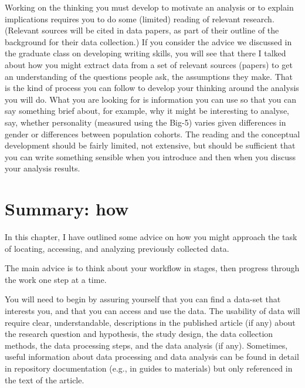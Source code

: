 \documentclass[
  letterpaper,
  DIV=11,
  numbers=noendperiod]{scrreprt}
\begin{document}
Working on the thinking you must develop to motivate an analysis or to
explain implications requires you to do some (limited) reading of
relevant research. (Relevant sources will be cited in data papers, as
part of their outline of the background for their data collection.) If
you consider the advice we discussed in the graduate class on developing
writing skills, you will see that there I talked about how you might
extract data from a set of relevant sources (papers) to get an
understanding of the questions people ask, the assumptions they make.
That is the kind of process you can follow to develop your thinking
around the analysis you will do. What you are looking for is information
you can use so that you can say something brief about, for example, why
it might be interesting to analyse, say, whether personality (measured
using the Big-5) varies given differences in gender or differences
between population cohorts. The reading and the conceptual development
should be fairly limited, not extensive, but should be sufficient that
you can write something sensible when you introduce and then when you
discuss your analysis results.

\hypertarget{sec-how-summary}{%
\section{Summary: how}\label{sec-how-summary}}

In this chapter, I have outlined some advice on how you might approach
the task of locating, accessing, and analyzing previously collected
data.

\begin{tcolorbox}[enhanced jigsaw, opacitybacktitle=0.6, title=\textcolor{quarto-callout-tip-color}{\faLightbulb}\hspace{0.5em}{Tip}, arc=.35mm, colbacktitle=quarto-callout-tip-color!10!white, colframe=quarto-callout-tip-color-frame, leftrule=.75mm, opacityback=0, breakable, titlerule=0mm, left=2mm, bottomrule=.15mm, toprule=.15mm, colback=white, coltitle=black, bottomtitle=1mm, toptitle=1mm, rightrule=.15mm]

The main advice is to think about your workflow in stages, then progress
through the work one step at a time.

\end{tcolorbox}

You will need to begin by assuring yourself that you can find a data-set
that interests you, and that you can access and use the data. The
usability of data will require clear, understandable, descriptions in
the published article (if any) about the research question and
hypothesis, the study design, the data collection methods, the data
processing steps, and the data analysis (if any). Sometimes, useful
information about data processing and data analysis can be found in
detail in repository documentation (e.g., in guides to materials) but
only referenced in the text of the article.
\end{document}
